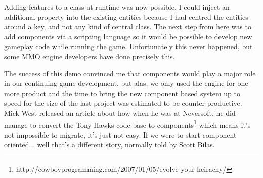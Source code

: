 Adding features to a class at runtime was now possible. I could inject an
additional property into the existing entities because I had centred the
entities around a key, and not any kind of central class. The next step from
here was to add components via a scripting language so it would be possible to
develop new gameplay code while running the game. Unfortunately this never
happened, but some MMO engine developers have done precisely this.

The success of this demo convinced me that components would play a major role
in our continuing game development, but alas, we only used the engine for one
more product and the time to bring the new component based system up to speed
for the size of the last project was estimated to be counter productive. Mick
West released an article about how when he was at Neversoft, he did manage to
convert the Tony Hawks code-base to
components\footnote{http://cowboyprogramming.com/2007/01/05/evolve-your-heirachy/}
which means it's not impossible to migrate, it's just not easy. If we were to
start component oriented... well that's a different story, normally told by
Scott Bilas.
